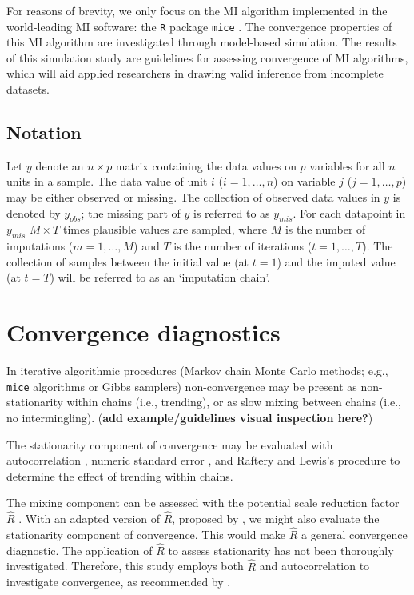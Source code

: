 \documentclass[Royal,times,sageh]{sagej}
\begin{document}
For reasons of brevity, we only focus on the MI algorithm implemented in
the world-leading MI software: the \texttt{R} \citep{R} package
\texttt{mice} \citep{mice}. The convergence properties of this MI
algorithm are investigated through model-based simulation. The results
of this simulation study are guidelines for assessing convergence of MI
algorithms, which will aid applied researchers in drawing valid
inference from incomplete datasets.

\hypertarget{notation}{%
\subsection{Notation}\label{notation}}

Let \(y\) denote an \(n \times p\) matrix containing the data values on
\(p\) variables for all \(n\) units in a sample. The data value of unit
\(i\) (\(i = 1, \dots, n\)) on variable \(j\) (\(j = 1, \dots, p\)) may
be either observed or missing. The collection of observed data values in
\(y\) is denoted by \(y_{obs}\); the missing part of \(y\) is referred
to as \(y_{mis}\). For each datapoint in \(y_{mis}\) \(M \times T\)
times plausible values are sampled, where \(M\) is the number of
imputations (\(m = 1, \dots, M\)) and \(T\) is the number of iterations
(\(t = 1, \dots, T\)). The collection of samples between the initial
value (at \(t=1\)) and the imputed value (at \(t=T\)) will be referred
to as an `imputation chain'.

\hypertarget{convergence-diagnostics}{%
\section{Convergence diagnostics}\label{convergence-diagnostics}}

In iterative algorithmic procedures (Markov chain Monte Carlo methods;
e.g., \texttt{mice} algorithms or Gibbs samplers) non-convergence may be
present as non-stationarity within chains (i.e., trending), or as slow
mixing between chains (i.e., no intermingling). (\textbf{add
example/guidelines visual inspection here?})

The stationarity component of convergence may be evaluated with
autocorrelation \citep[\(AC\);][]{scha97, gelm13}, numeric standard
error \citep[or `MC error';][]{gewe92}, and Raftery and Lewis's
\citeyearpar{raft91} procedure to determine the effect of trending
within chains.

The mixing component can be assessed with the potential scale reduction
factor \(\widehat{R}\) \citep[a.k.a. `Gelman-Rubin
statistic';][]{gelm92}. With an adapted version of \(\widehat{R}\),
proposed by \citet{veht19}, we might also evaluate the stationarity
component of convergence. This would make \(\widehat{R}\) a general
convergence diagnostic. The application of \(\widehat{R}\) to assess
stationarity has not been thoroughly investigated. Therefore, this study
employs both \(\widehat{R}\) and autocorrelation to investigate
convergence, as recommended by \citep[p.~898]{cowl96}.
\end{document}
